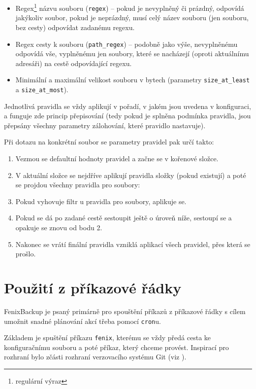 \begin{itemize}
	\item Regex\footnote{regulární výraz} názvu souboru (\texttt{regex}) --
	pokud je nevyplněný či prázdný, odpovídá jakýkoliv soubor, pokud je
	neprázdný, musí celý název souboru (jen souboru, bez cesty) odpovídat
	zadanému regexu.
	\item Regex cesty k souboru (\texttt{path\_regex}) -- podobně jako výše,
	nevyplněnému odpovídá vše, vyplněnému jen soubory, které se nacházejí
	(oproti aktuálnímu adresáři) na cestě odpovídající regexu.
	\item Minimální a maximální velikost souboru v bytech (parametry
	\texttt{size\_at\_least} a \texttt{size\_at\_most}).
\end{itemize}

Jednotlivá pravidla se vždy aplikují v pořadí, v jakém jsou uvedena v konfiguraci,
a funguje zde princip přepisování (tedy pokud je splněna podmínka pravidla, jsou
přepsány všechny parametry zálohování, které pravidlo nastavuje).

\medskip\goodbreak

\noindent Při dotazu na konkrétní soubor se parametry pravidel pak určí takto:
\begin{enumerate}
	\item Vezmou se defaultní hodnoty pravidel a začne se v kořenové složce.
	\item V aktuální složce se nejdříve aplikují pravidla složky (pokud
	existují) a poté se projdou všechny pravidla pro soubory:
	\item Pokud vyhovuje filtr u pravidla pro soubory, aplikuje se.
	\item Pokud se dá po zadané cestě sestoupit ještě o úroveň níže, sestoupí
	se a opakuje se znovu od bodu 2.
	\item Nakonec se vrátí finální pravidla vzniklá aplikací všech pravidel,
	přes která se prošlo.
\end{enumerate}

\section{Použití z příkazové řádky}

FenixBackup je psaný primárně pro spouštění příkazů z příkazové řádky s cílem
umožnit snadné plánování akcí třeba pomocí \texttt{cron}u.

Základem je spuštění příkazu \texttt{fenix}, kterému se vždy předá cesta ke
konfiguračnímu souboru a poté příkaz, který chceme provést. Inspirací pro
rozhraní bylo zčásti rozhraní verzovacího systému Git (viz \cite{progit}).


